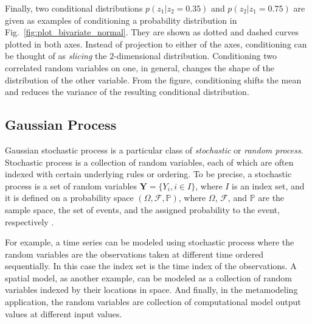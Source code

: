 Finally, two conditional distributions $p(z_1|z_2=0.35)$ and $p(z_2|z_1=0.75)$ are given as examples of conditioning a probability distribution in Fig.~\ref{fig:plot_bivariate_normal}.
They are shown as dotted and dashed curves plotted in both axes.
Instead of projection to either of the axes, conditioning can be thought of as \emph{slicing} the $2$-dimensional distribution.
Conditioning two correlated random variables on one, in general, changes the shape of the distribution of the other variable.
From the figure, conditioning shifts the mean and reduces the variance of the resulting conditional distribution. 



\subsection{Gaussian Process}

Gaussian stochastic process is a particular class of \emph{stochastic} or \emph{random process}.
Stochastic process is a collection of random variables, each of which are often indexed with certain underlying rules or ordering.
To be precise, a stochastic process is a set of random variables $\mathbf{Y} = \{Y_i, i \in I\}$, where $I$ is an index set, 
and it is defined on a probability space $(\Omega, \mathcal{F}, \mathbb{P})$, 
where $\Omega$, $\mathcal{F}$, and $\mathbb{P}$ are the sample space, the set of events, and the assigned probability to the event, respectively \cite{Syski2014}.

For example, a time series can be modeled using stochastic process where the random variables are the observations taken at different time ordered sequentially.
In this case the index set is the time index of the observations.
A spatial model, as another example, can be modeled as a collection of random variables indexed by their locations in space.
And finally, in the metamodeling application, the random variables are collection of computational model output values at different input values.

